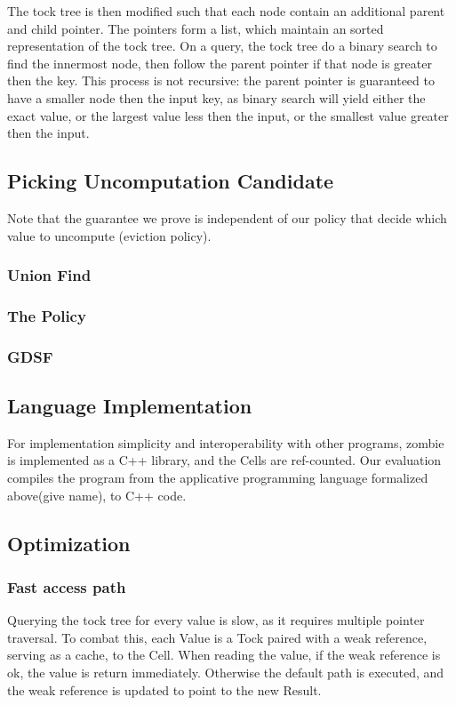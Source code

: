 \documentclass[acmsmall]{acmart}
\begin{document}
	The tock tree is then modified such that each node contain an additional parent and child pointer. The pointers form a list, which maintain an sorted representation of the tock tree. On a query, the tock tree do a binary search to find the innermost node, then follow the parent pointer if that node is greater then the key. This process is not recursive: the parent pointer is guaranteed to have a smaller node then the input key, as binary search will yield either the exact value, or the largest value less then the input, or the smallest value greater then the input.
	\subsection{Picking Uncomputation Candidate}
	Note that the guarantee we prove is independent of our policy that decide which value to uncompute (eviction policy).
	\subsubsection{Union Find}
	\subsubsection{The Policy}
	\subsubsection{GDSF}
	\subsection{Language Implementation}
	For implementation simplicity and interoperability with other programs, zombie is implemented as a C++ library, and the Cells are ref-counted. Our evaluation compiles the program from the applicative programming language formalized above(give name), to C++ code.
	\subsection{Optimization}
	\subsubsection{Fast access path}
	Querying the tock tree for every value is slow, as it requires multiple pointer traversal.
	To combat this, each Value is a Tock paired with a weak reference, serving as a cache, to the Cell. When reading the value, if the weak reference is ok, the value is return immediately. Otherwise the default path is executed, and the weak reference is updated to point to the new Result.
\end{document}
